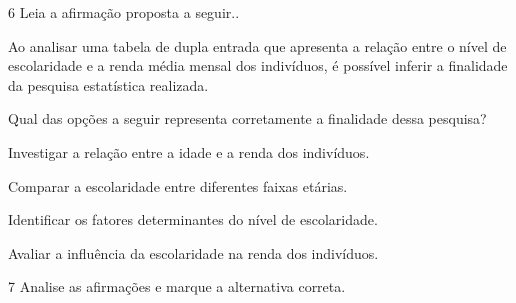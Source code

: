 




\num{6} Leia a afirmação proposta a seguir..

\begin{myquote}
Ao analisar uma tabela de dupla entrada que apresenta a relação entre
o nível de escolaridade e a renda média mensal dos indivíduos, é
possível inferir a finalidade da pesquisa estatística realizada.
\end{myquote}

Qual das opções a seguir representa corretamente a finalidade dessa pesquisa?

\begin{escolha}
\item Investigar a relação entre a idade e a renda dos indivíduos.
\item Comparar a escolaridade entre diferentes faixas etárias.
\item Identificar os fatores determinantes do nível de escolaridade.
\item Avaliar a influência da escolaridade na renda dos indivíduos.
\end{escolha}





\pagebreak
\num{7} Analise as afirmações e marque a alternativa correta.

